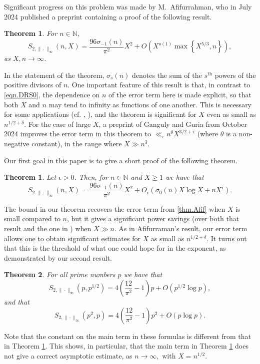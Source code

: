 \documentclass[reqno]{amsart}
\newcommand{\N}{\mathbb{N}}
\newcommand{\rar}{\rightarrow}
\newtheorem*{theorem1*}{Theorem \cite[Theorem 1.1]{Afif2024}}
\newtheorem{theorem}{Theorem}
\begin{document}
Significant progress on this problem was made by M.~Afifurrahman, who in July 2024 published a preprint containing a proof  of the following result.
\begin{theorem1*} For $n\in\N$,
	\begin{equation}\label{thm.Afif}
	S_{2,\|\cdot\|_\infty}(n,X)=\frac{96\sigma_{-1}(n)}{\pi^2}X^2+O\left(X^{o(1)}\max\left\{X^{5/3},n\right\}\right),
\end{equation}
as $X,n\rar\infty$.
\end{theorem1*}
In the statement of the theorem, $\sigma_s(n)$ denotes the sum of the $s^{\text{th}}$ powers of the positive divisors of $n$. One important feature of this result is that, in contrast to \eqref{eqn.DRS0}, the dependence on $n$ of the error term here is made explicit, so that both $X$ and $n$ may tend to infinity as functions of one another. This is necessary for some applications (cf. \cite[Theorem 4]{Shpa2010}, \cite[Section 2.2]{OstaShpa2025}), and the theorem is significant for $X$ even as small as $n^{1/2+\delta}$. For the case of large $X$, a preprint of Ganguly and Guria \cite{GangGuri2024} from October 2024  improves the error term in this theorem to $\ll_\epsilon n^\theta X^{3/2+\epsilon}$ (where $\theta$ is a non-negative constant), in the range where $X\gg n^3$.

Our first goal in this paper is to give a short proof of the following theorem.
\begin{theorem}\label{thm.Main0}
	Let $\epsilon>0$. Then, for $n\in\N$ and $X\ge 1$ we have that
	\begin{equation*}
		S_{2,\|\cdot\|_\infty}(n,X)=\frac{96\sigma_{-1}(n)}{\pi^2}X^2+O_\epsilon\left(\sigma_0(n)X\log X+nX^\epsilon\right).
	\end{equation*}
\end{theorem}
The bound in our theorem recovers the error term from \eqref{thm.Afif} when $X$ is small compared to $n$, but it gives a significant power savings (over both that result and the one in \cite{GangGuri2024}) when $X\gg n$. As in Afifurraman's result, our error term allows one to obtain significant estimates for $X$ as small as $n^{1/2+\delta}$. It turns out that this is the threshold of what one could hope for in the exponent, as demonstrated by our second result.
\begin{theorem}\label{thm.Main1}
	For all prime numbers $p$ we have that
	\begin{equation*}
		S_{2,\|\cdot\|_\infty}(p,p^{1/2})=4\left(\frac{12}{\pi^2}-1\right)p+O\left(p^{1/2}\log p\right),
	\end{equation*}
	and that
	\begin{equation*}
	S_{2,\|\cdot\|_\infty}(p^2,p)=4\left(\frac{12}{\pi^2}-1\right)p^2+O\left(p\log p\right).
\end{equation*}
\end{theorem}
Note that the constant on the main term in these formulas is different from that in Theorem \ref{thm.Main0}. This shows, in particular, that the main term in Theorem \ref{thm.Main0} does not give a correct asymptotic estimate, as $n\rar\infty,$ with  $X=n^{1/2}$.
\end{document}

